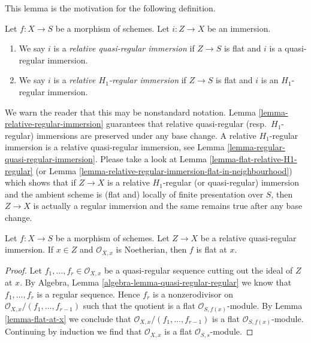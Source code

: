 \noindent
This lemma is the motivation for the following definition.

\begin{definition}
\label{definition-relative-H1-regular-immersion}
Let $f : X \to S$ be a morphism of schemes.
Let $i : Z \to X$ be an immersion.
\begin{enumerate}
\item We say $i$ is a {\it relative quasi-regular immersion}
if $Z \to S$ is flat and $i$ is a quasi-regular immersion.
\item We say $i$ is a {\it relative $H_1$-regular immersion}
if $Z \to S$ is flat and $i$ is an $H_1$-regular immersion.
\end{enumerate}
\end{definition}

\noindent
We warn the reader that this may be nonstandard notation.
Lemma \ref{lemma-relative-regular-immersion}
guarantees that relative quasi-regular (resp.\ $H_1$-regular)
immersions are preserved under any base change.
A relative $H_1$-regular immersion is a relative quasi-regular immersion, see
Lemma \ref{lemma-regular-quasi-regular-immersion}.
Please take a look at
Lemma \ref{lemma-flat-relative-H1-regular}
(or
Lemma \ref{lemma-relative-regular-immersion-flat-in-neighbourhood})
which shows that if $Z \to X$ is a relative $H_1$-regular
(or quasi-regular) immersion and the ambient scheme is (flat and)
locally of finite presentation over $S$, then $Z \to X$
is actually a regular immersion and the same remains true after
any base change.

\begin{lemma}
\label{lemma-quasi-regular-immersion-flat-at-x}
Let $f : X \to S$ be a morphism of schemes.
Let $Z \to X$ be a relative quasi-regular immersion.
If $x \in Z$ and $\mathcal{O}_{X, x}$ is Noetherian, then $f$ is flat at $x$.
\end{lemma}

\begin{proof}
Let $f_1, \ldots, f_r \in \mathcal{O}_{X, x}$ be a quasi-regular
sequence cutting out the ideal of $Z$ at $x$. By
Algebra, Lemma \ref{algebra-lemma-quasi-regular-regular}
we know that $f_1, \ldots, f_r$ is a regular sequence.
Hence $f_r$ is a nonzerodivisor on
$\mathcal{O}_{X, x}/(f_1, \ldots, f_{r - 1})$ such that the
quotient is a flat $\mathcal{O}_{S, f(x)}$-module.
By
Lemma \ref{lemma-flat-at-x}
we conclude that $\mathcal{O}_{X, x}/(f_1, \ldots, f_{r - 1})$
is a flat $\mathcal{O}_{S, f(x)}$-module.
Continuing by induction we find that $\mathcal{O}_{X, x}$
is a flat $\mathcal{O}_{S, s}$-module.
\end{proof}

